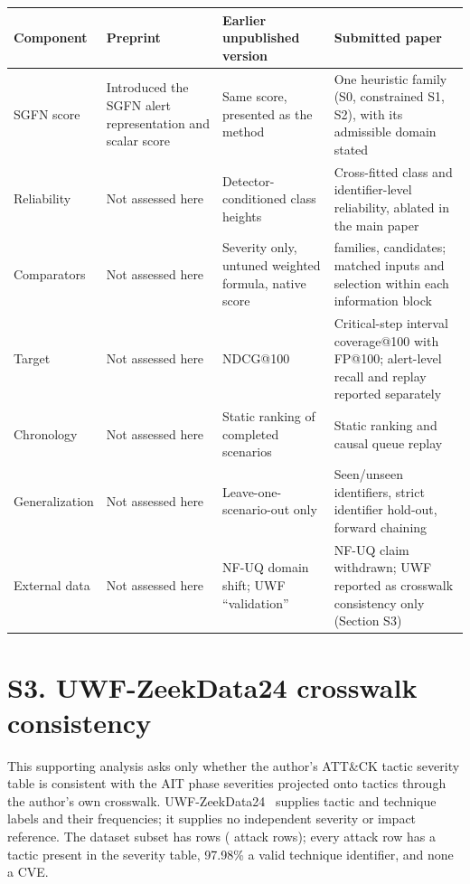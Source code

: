\documentclass[pdflatex,sn-basic,Numbered]{sn-jnl}
\begin{document}
\begin{tableorg}[t]
\caption{Relation between the preprint, the earlier unpublished version of this study, and the submitted paper.}
\label{tab:s-versions}
\small
\setlength{\tabcolsep}{4pt}
\begin{tabular}{>{\raggedright\arraybackslash}p{}>{\raggedright\arraybackslash}p{}>{\raggedright\arraybackslash}p{}>{\raggedright\arraybackslash}p{}}
\toprule
Component & Preprint~\citep{Moran2026RiskAversePreprint} & Earlier unpublished version & Submitted paper \\
\midrule
SGFN score & Introduced the SGFN alert representation and scalar score & Same score, presented as the method & One heuristic family (S0, constrained S1, S2), with its admissible domain stated \\
Reliability & Not assessed here & Detector-conditioned class heights & Cross-fitted class and identifier-level reliability, ablated in the main paper \\
Comparators & Not assessed here & Severity only, untuned weighted formula, native score & 13 families, \NCandidates{} candidates; matched inputs and selection within each information block \\
Target & Not assessed here & NDCG@100 & Critical-step interval coverage@100 with FP@100; alert-level recall and replay reported separately \\
Chronology & Not assessed here & Static ranking of completed scenarios & Static ranking and causal queue replay \\
Generalization & Not assessed here & Leave-one-scenario-out only & Seen/unseen identifiers, strict identifier hold-out, forward chaining \\
External data & Not assessed here & NF-UQ domain shift; UWF ``validation'' & NF-UQ claim withdrawn; UWF reported as crosswalk consistency only (Section S3) \\
\bottomrule
\end{tabular}
\end{tableorg}
\FloatBarrier

\section*{S3. UWF-ZeekData24 crosswalk consistency}
This supporting analysis asks only whether the author's ATT\&CK tactic severity table is consistent with the AIT phase severities projected onto tactics through the author's own crosswalk. UWF-ZeekData24~\citep{Elam2025UWFZeekData24} supplies tactic and technique labels and their frequencies; it supplies no independent severity or impact reference. The dataset subset has \UWFRows{} rows (\UWFAttackRows{} attack rows); every attack row has a tactic present in the severity table, 97.98\% a valid technique identifier, and none a CVE.
\end{document}
